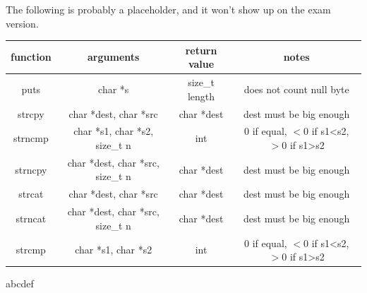\documentclass[letterpaper,12pt]{exam}
\begin{document}
\newpage
\vspace{0.5in}
The following is probably a placeholder, and it won't show up on the exam version.\\
\begin{tabular}{|c|c|c|c|}
    \hline
   function & arguments & return value & notes\\    
    \hline
    puts & char *s & size\_t length & does not count null byte \\
    \hline
    strcpy & char *dest, char *src & char *dest & dest must be big enough \\
    \hline
    strncmp & char *s1, char *s2, size\_t n & int & 0 if equal, $<$0 if s1<s2, $>$0 if s1>s2 \\
    \hline
    strncpy & char *dest, char *src, size\_t n & char *dest & dest must be big enough \\
    \hline
    strcat & char *dest, char *src & char *dest & dest must be big enough \\
    \hline
    strncat & char *dest, char *src, size\_t n & char *dest & dest must be big enough \\
    \hline
    strcmp & char *s1, char *s2 & int & 0 if equal, $<$0 if s1<s2, $>$0 if s1>s2 \\
    \hline
\end{tabular}
   \twocolumn

abcdef
\end{document}
